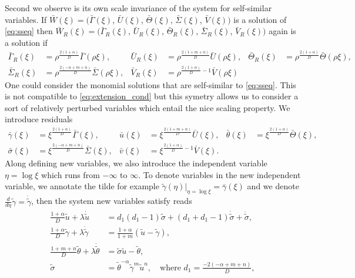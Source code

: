 \documentclass[a4paper,11pt]{article}
\def\blue{\color{blue}}
\def\bG{{\bar{\Gamma}}}
\def\bV{{\bar{V}}}
\def\bTh{{\bar{\Theta}}}
\def\bS{{\bar{\Sigma}}}
\def\bU{{\bar{U}}}
\def\bg{{\bar{\gamma}}}
\def\bv{{\bar{v}}}
\def\bth{{\bar{\theta}}}
\def\bs{{\bar{\sigma}}}
\def\bu{{\bar{u}}}
\def\tg{{\tilde{\gamma}}}
\def\tth{{\tilde{\theta}}}
\def\ts{{\tilde{\sigma}}}
\def\tu{{\tilde{u}}}
\theoremstyle{remark}
\begin{document}
Second we observe is its own scale invariance of the system for self-similar variables. If $\bar{W}(\xi)=\big(\bG(\xi)$, $\bU(\xi)$, $\bTh(\xi)$, $\bS(\xi)$, $\bV(\xi)\big)$ is a solution of \eqref{eq:sseq} then $\bar{W}_R(\xi)=\big(\bG _R(\xi)$, $\bU_R(\xi)$, $\bTh_R(\xi)$, $\bS_R(\xi)$, $\bV_R(\xi)\big)$ again is a solution if
{\blue
\begin{align*}
\bG _R(\xi)&=\rho^ \frac{2(1+ \alpha)}{D}\bG(\rho\xi), & \bU _R(\xi) &= \rho^ \frac{2(1+ m+n)}{D}\bU(\rho\xi), &
\bTh _R(\xi)&=\rho^ \frac{2(1+ \alpha)}{D}\bTh(\rho\xi), \\
\bS _R(\xi)&=\rho^ \frac{2(-\alpha+m+n)}{D}\bS(\rho\xi), & \bV _R(\xi) &=\rho^ {\frac{2(1+ \alpha)}{D}-1}\bV(\rho\xi)
\end{align*}
}
One could consider the monomial solutions that are self-similar to \eqref{eq:sseq}. This is not compatible to \eqref{eq:extension_cond} but this symetry allows us to consider a sort of relatively perturbed variables which entail the nice scaling property. We introduce residuals
\begin{align*}
\bg(\xi) &= \xi^ \frac{2(1+ \alpha)}{D}\bG(\xi), & \bu(\xi) &= \xi^ \frac{2(1+ m+n)}{D}\bU(\xi), &
\bth(\xi)&=\xi^ \frac{2(1+ \alpha)}{D}\bTh(\xi), \\
\bs(\xi)&=\xi^ \frac{2(-\alpha+m+n)}{D}\bS(\xi), & \bv(\xi) &=\xi^ {\frac{2(1+ \alpha)}{D}-1}\bV(\xi).
\end{align*}
Along defining new variables, we also introduce the independent variable $\eta = \log\xi$ which runs from $-\infty$ to $\infty$. To denote variables in the new independent variable, we annotate the tilde for example $\tg(\eta)|_{\eta=\log\xi}=\bg(\xi)$ and we denote $\frac{d}{d\eta} \tg = \dot\tg$, then the system new variables satisfy reads
\begin{equation} \label{eq:tildesys}
\begin{aligned}
\frac{1+ \alpha}{D} \tu + \lambda \dot\tu &= d_1(d_1-1)\ts + (d_1+d_1-1)\dot\ts + \ddot\ts,\\
\frac{1+ \alpha}{D} \tg + \lambda \dot\tg &= \frac{1 + \alpha}{1+m}( \tu - \tg ),\\
\frac{1+ m+n}{D} \tth + \lambda \dot\tth &= \ts\tu-\tth,\\
\ts &=\tth^{- \alpha} \tg ^m \tu ^n, \quad \text{where $d_1=\frac{-2(- \alpha +m+n)}{D}$},
\end{aligned}
\end{equation}
\end{document}

